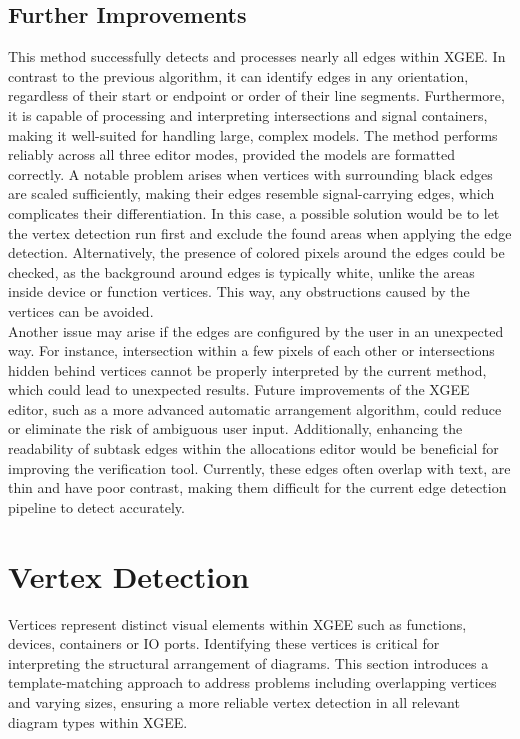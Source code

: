 \subsection{Further Improvements}
This method successfully detects and processes nearly all edges within XGEE. In contrast to the previous algorithm, it can identify edges in any orientation, regardless of their start or endpoint or order of their line segments. Furthermore, it is capable of processing and interpreting intersections and signal containers, making it well-suited for handling large, complex models. The method performs reliably across all three editor modes, provided the models are formatted correctly.
A notable problem arises when vertices with surrounding black edges are scaled sufficiently, making their edges resemble signal-carrying edges, which complicates their differentiation. In this case, a possible solution would be to let the vertex detection run first and exclude the found areas when applying the edge detection. Alternatively, the presence of colored pixels around the edges could be checked, as the background around edges is typically white, unlike the areas inside device or function vertices. This way, any obstructions caused by the vertices can be avoided.\\
Another issue may arise if the edges are configured by the user in an unexpected way. For instance, intersection within a few pixels of each other or intersections hidden behind vertices cannot be properly interpreted by the current method, which could lead to unexpected results. Future improvements of the XGEE editor, such as a more advanced automatic arrangement algorithm, could reduce or eliminate the risk of ambiguous user input. Additionally, enhancing the readability of subtask edges within the allocations editor would be beneficial for improving the verification tool. Currently, these edges often overlap with text, are thin and have poor contrast, making them difficult for the current edge detection pipeline to detect accurately.

\section{Vertex Detection}
Vertices represent distinct visual elements within XGEE such as functions, devices, containers or IO ports. Identifying these vertices is critical for interpreting the structural arrangement of diagrams. This section introduces a template-matching approach to address problems including overlapping vertices and varying sizes, ensuring a more reliable vertex detection in all relevant diagram types within XGEE.

